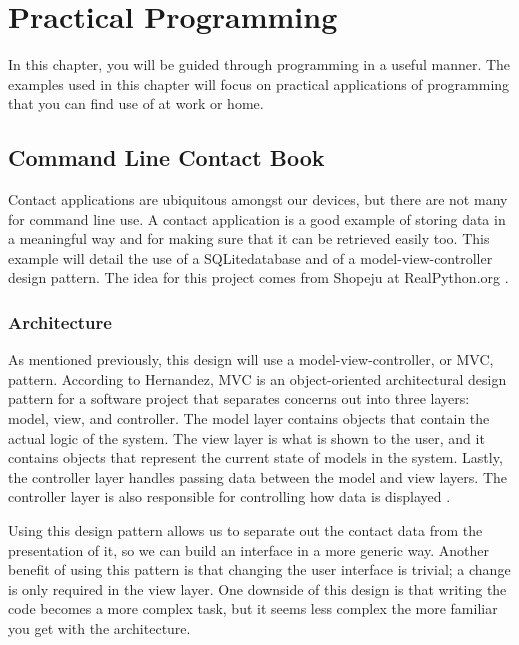 \documentclass[12pt, oneside, a4paper]{book}
\begin{document}
   \chapter{Practical Programming}
   \label{chap:practical}
      In this chapter, you will be guided through programming in a useful manner.
      The examples used in this chapter will focus on practical applications of programming that you can find use of at work or home.

      \section{Command Line Contact Book}
      Contact applications are ubiquitous amongst our devices, but there are not many for command line use.
      A contact application is a good example of storing data in a meaningful way and for making sure that it can be retrieved easily too.
      This example will detail the use of a SQLite\footnotemark database and of a model-view-controller design pattern.
      The idea for this project comes from Shopeju at RealPython.org \autocite{shopeju13ProjectIdeas}.


      \subsection{Architecture}
      As mentioned previously, this design will use a model-view-controller, or MVC, pattern.
      According to Hernandez, MVC is an object-oriented architectural design pattern for a software project that separates concerns out into three layers: model, view, and controller.
      The model layer contains objects that contain the actual logic of the system.
      The view layer is what is shown to the user, and it contains objects that represent the current state of models in the system.
      Lastly, the controller layer handles passing data between the model and view layers.
      The controller layer is also responsible for controlling how data is displayed \autocite{hernandezModelViewController2021}.

      Using this design pattern allows us to separate out the contact data from the presentation of it, so we can build an interface in a more generic way.
      Another benefit of using this pattern is that changing the user interface is trivial; a change is only required in the view layer.
      One downside of this design is that writing the code becomes a more complex task, but it seems less complex the more familiar you get with the architecture.
\end{document}
